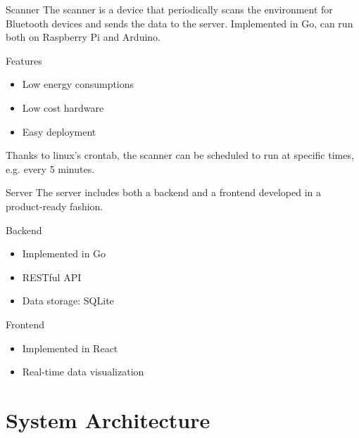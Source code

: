 \documentclass{beamer}
\begin{document}
\begin{frame}{Scanner}
	The scanner is a device that periodically scans \footnotemark the environment for Bluetooth devices and sends the data to the server.
	\vspace{1em}
	Implemented in Go, can run both on Raspberry Pi and Arduino\footnotemark.
	\begin{block}
		{Features}
		\begin{itemize}
			\item Low energy consumptions
			\item Low cost hardware
			\item Easy deployment
		\end{itemize}
	\end{block}

	Thanks to linux's crontab, the scanner can be scheduled to run at specific times, e.g. every 5 minutes.

\end{frame}
\begin{frame}{Server}
	The server includes both a backend and a frontend developed in a product-ready fashion.
	\begin{block}
		{Backend}
		\begin{itemize}
			\item Implemented in Go
			\item RESTful API
			\item Data storage: SQLite
		\end{itemize}
	\end{block}

	\begin{block}
		{Frontend}
		\begin{itemize}
			\item Implemented in React
			\item Real-time data visualization
		\end{itemize}
	\end{block}

\end{frame}

\section{System Architecture}
\end{document}
